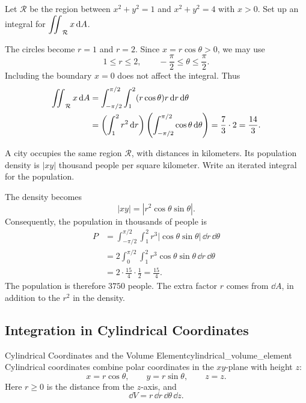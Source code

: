 \clearpage
\begin{example}
Let $\mathcal{R}$ be the region between $x^2 + y^2 = 1$ and $x^2 + y^2 = 4$ with $x > 0$. Set up an integral for $\displaystyle\mathop{\int\mkern-10mu\int}\nolimits_{\mathcal{R}} x \, \mathrm{d}A$.
\end{example}

\begin{sol}
The circles become $r = 1$ and $r = 2$. Since $x = r\cos\theta > 0$, we may use
\[
    1 \leq r \leq 2,\qquad -\frac{\pi}{2} \leq \theta \leq \frac{\pi}{2}.
\]
Including the boundary $x = 0$ does not affect the integral. Thus
\begin{align*}
    \mathop{\int\mkern-10mu\int}\nolimits_{\mathcal{R}} x \, \mathrm{d}A
    &= \int_{-\pi/2}^{\pi/2}\int_1^2
    (r\cos\theta)r\,\mathrm{d}r\,\mathrm{d}\theta\\
    &= \left(\int_1^2r^2\,\mathrm{d}r\right)
    \left(\int_{-\pi/2}^{\pi/2}\cos\theta\,\mathrm{d}\theta\right)
    = \frac{7}{3}\cdot 2 = \frac{14}{3}.
\end{align*}
\end{sol}

\begin{example}
A city occupies the same region $\mathcal{R}$, with distances in kilometers. Its population density is $|xy|$ thousand people per square kilometer. Write an iterated integral for the population.
\end{example}

\begin{sol}
The density becomes
\[
    |xy| = |r^2\cos\theta\sin\theta|.
\]
Consequently, the population in thousands of people is
\begin{align*}
    P &= \int_{-\pi/2}^{\pi/2}\int_1^2
    r^3|\cos\theta\sin\theta|\,\dd{r}\,\dd{\theta}\\
    &= 2\int_0^{\pi/2}\int_1^2
    r^3\cos\theta\sin\theta\,\dd{r}\,\dd{\theta}\\
    &= 2\cdot\frac{15}{4}\cdot\frac{1}{2} = \frac{15}{4}.
\end{align*}
The population is therefore $3750$ people. The extra factor $r$ comes from $\dd{A}$, in addition to the $r^2$ in the density.
\end{sol}

\clearpage
\subsection{Integration in Cylindrical Coordinates}

\begin{definition}{Cylindrical Coordinates and the Volume Element}{cylindrical_volume_element}
Cylindrical coordinates combine polar coordinates in the $xy$-plane with height $z$:
\[
    x = r\cos\theta,\qquad y = r\sin\theta,\qquad z = z.
\]
Here $r \geq 0$ is the distance from the $z$-axis, and
\[
    \boxed{\dd{V} = r\,\dd{r}\,\dd{\theta}\,\dd{z}}.
\]
\end{definition}

